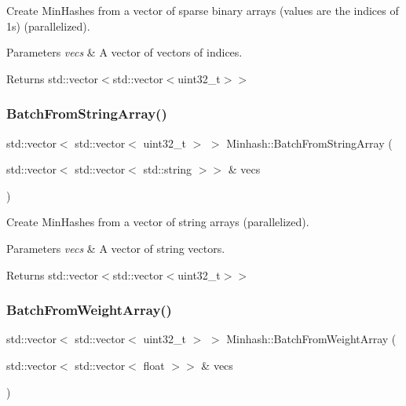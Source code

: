 Create Min\+Hashes from a vector of sparse binary arrays (values are the indices of 1s) (parallelized). 


\begin{DoxyParams}{Parameters}
{\em vecs} & A vector of vectors of indices. \\
\hline
\end{DoxyParams}
\begin{DoxyReturn}{Returns}
std\+::vector$<$std\+::vector$<$uint32\+\_\+t$>$$>$ 
\end{DoxyReturn}
\mbox{\label{classMinhash_adc3ebe293e9999e49a30f9e9b9a8e318}} 
\subsubsection{\texorpdfstring{Batch\+From\+String\+Array()}{BatchFromStringArray()}}
{\footnotesize\ttfamily std\+::vector$<$ std\+::vector$<$ uint32\+\_\+t $>$ $>$ Minhash\+::\+Batch\+From\+String\+Array (\begin{DoxyParamCaption}\item[{std\+::vector$<$ std\+::vector$<$ std\+::string $>$$>$ \&}]{vecs }\end{DoxyParamCaption})}



Create Min\+Hashes from a vector of string arrays (parallelized). 


\begin{DoxyParams}{Parameters}
{\em vecs} & A vector of string vectors. \\
\hline
\end{DoxyParams}
\begin{DoxyReturn}{Returns}
std\+::vector$<$std\+::vector$<$uint32\+\_\+t$>$$>$ 
\end{DoxyReturn}
\mbox{\label{classMinhash_ad38f8679778e6291f5e006f76f104312}} 
\subsubsection{\texorpdfstring{Batch\+From\+Weight\+Array()}{BatchFromWeightArray()}}
{\footnotesize\ttfamily std\+::vector$<$ std\+::vector$<$ uint32\+\_\+t $>$ $>$ Minhash\+::\+Batch\+From\+Weight\+Array (\begin{DoxyParamCaption}\item[{std\+::vector$<$ std\+::vector$<$ float $>$$>$ \&}]{vecs }\end{DoxyParamCaption})}



